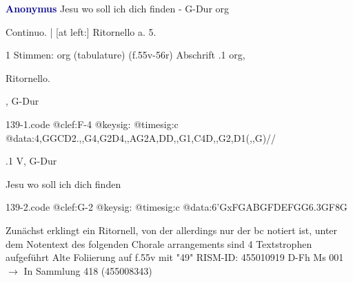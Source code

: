 \documentclass[twocolumn]{book}
\begin{document}
\newline \par \vspace{7pt} \textcolor{darkblue}{\textbf{Anonymus  }}
\newline Jesu wo soll ich dich finden - G-Dur
\newline org
\newline \begin{itshape}[f.55v, heading:] Continuo. | [at left:] Ritornello a. 5.\end{itshape} 
\newline \textcolor{darkblue}{}  1 Stimmen: org (tabulature)  (f.55v-56r)
\newline Abschrift
.1  org, \begin{itshape}Ritornello.\end{itshape}, G-Dur  
\begin{filecontents*}{139-1.code}
@clef:F-4
@keysig:
@timesig:c
@data:4,GGCD2.,,G4,G2D4,,AG2A,DD,,G1,C4D,,G2,D1(,,G)//
\end{filecontents*}
\newline
%
.1  V, G-Dur
\newline \begin{footnotesize} Jesu wo soll ich dich finden \end{footnotesize}  
\begin{filecontents*}{139-2.code}
@clef:G-2
@keysig:
@timesig:c
@data:{6'GxFGA}{BGFD}{EFGG}{6.3GF}8G
\end{filecontents*}
\newline
%
\newline Zunächst erklingt ein Ritornell, von der allerdings nur der bc notiert ist, unter dem Notentext des folgenden Chorale arrangements sind 4 Textstrophen aufgeführt
\newline Alte Foliierung auf f.55v mit "49"
\newline RISM-ID: 455010919
\newline D-Fh  Ms 001
\newline $\rightarrow$ In Sammlung 418 (455008343)
      
\end{document}
